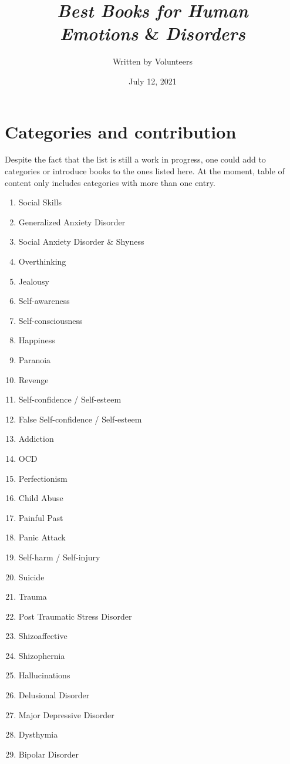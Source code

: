 \documentclass[12pt, a4paper]{article}
\title{\emph{Best Books for Human\\Emotions} \& \emph{Disorders}}
\author{Written by Volunteers}
\date{July 12, 2021}
\begin{document}
\maketitle

\section*{Categories and contribution}
Despite the fact that the list is still a work in progress, one could add to
categories or introduce books to the ones listed here. At the moment, table of
content only includes categories with more than one entry.
\begin{enumerate}
    \item Social Skills
    \item Generalized Anxiety Disorder
    \item Social Anxiety Disorder \& Shyness
    \item Overthinking
    \item Jealousy
    \item Self-awareness
    \item Self-consciousness
    \item Happiness
    \item Paranoia
    \item Revenge
    \item Self-confidence / Self-esteem
    \item False Self-confidence / Self-esteem
    \item Addiction
    \item OCD
    \item Perfectionism
    \item Child Abuse
    \item Painful Past
    \item Panic Attack
    \item Self-harm / Self-injury
    \item Suicide
    \item Trauma
    \item Post Traumatic Stress Disorder
    \item Shizoaffective
    \item Shizophernia
    \item Hallucinations
    \item Delusional Disorder
    \item Major Depressive Disorder
    \item Dysthymia
    \item Bipolar Disorder
\end{enumerate}
\end{document}
